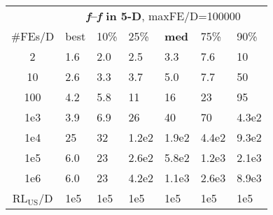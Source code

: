 \begin{tabular}{c|llllll}
 & \multicolumn{6}{|c}{\textbf{\textit{f}\raisebox{-0.35ex}{1}--\textit{f}\raisebox{-0.35ex}{24} in 5-D}, maxFE/D=100000}\\
\#FEs/D & best & 10\% & 25\% & \textbf{med} & 75\% & 90\%\\
2 & \hspace*{1ex}1.6 & \hspace*{1ex}2.0 & \hspace*{1ex}2.5 & \hspace*{1ex}3.3 & \hspace*{1ex}7.6 & 10\\
10 & \hspace*{1ex}2.6 & \hspace*{1ex}3.3 & \hspace*{1ex}3.7 & \hspace*{1ex}5.0 & \hspace*{1ex}7.7 & 50\\
100 & \hspace*{1ex}4.2 & \hspace*{1ex}5.8 & 11 & 16 & 23 & 95\\
1e3 & \hspace*{1ex}3.9 & \hspace*{1ex}6.9 & 26 & 40 & 70 & 4.3e2\\
1e4 & 25 & 32 & 1.2e2 & 1.9e2 & 4.4e2 & 9.3e2\\
1e5 & \hspace*{1ex}6.0 & 23 & 2.6e2 & 5.8e2 & 1.2e3 & 2.1e3\\
1e6 & \hspace*{1ex}6.0 & 23 & 4.2e2 & 1.1e3 & 2.6e3 & 8.9e3\\
$\text{RL}_{\text{US}}$/D & 1e5 & 1e5 & 1e5 & 1e5 & 1e5 & 1e5
\end{tabular}
